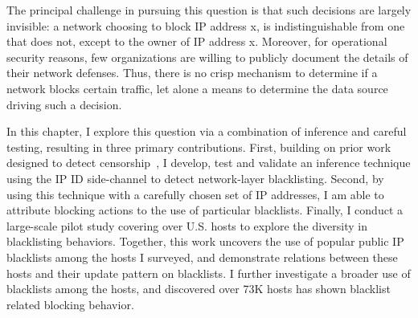 The principal challenge in pursuing this question is that such
decisions are largely invisible: a network choosing to block IP
address x, is indistinguishable from one that does not, except to the
owner of IP address x.  Moreover, for operational security reasons,
few organizations are willing to publicly document the details of
their network defenses. Thus, there is no crisp mechanism to
determine if a network blocks certain traffic, let alone a means to
determine the data source driving such a decision.

In this chapter, I explore this question via a combination of inference
and careful testing, resulting in three primary contributions.
First, building on prior work designed to detect
censorship~\cite{ensafi2014detecting, pearce2017augur}, I develop,
test and validate an inference technique using the IP ID side-channel to
detect network-layer blacklisting.  Second, by using this technique with 
a carefully chosen set of IP addresses, I am able to attribute
blocking actions to the use of particular blacklists. Finally, I conduct 
a large-scale pilot study covering over {} U.S. hosts
to explore the diversity in blacklisting behaviors. Together, this work
uncovers the use of {\blacklistnum} popular public IP blacklists among
the hosts I surveyed, and demonstrate relations between these hosts
and their update pattern on blacklists. I further investigate a broader
use of blacklists among the hosts, and discovered over 73K hosts has
shown blacklist related blocking behavior.





%
%
%








%

